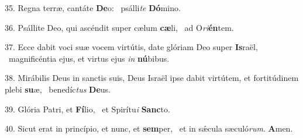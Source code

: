 35. Regna terræ, cantáte \textbf{De}o: \ast\  psálli\textit{te} \textbf{Dó}mino.\

36. Psállite Deo, qui ascéndit super cælum \textbf{cæ}li, \ast\  ad O\textit{ri}\textbf{én}tem.\

37. Ecce dabit voci suæ vocem virtútis, date glóriam Deo super \textbf{Is}raël, \ast\  magnificéntia ejus, et virtus ejus \textit{in} \textbf{nú}bibus.\

38. Mirábilis Deus in sanctis suis, Deus Israël ipse dabit virtútem, et fortitúdinem plebi \textbf{su}æ, \ast\  benedíc\textit{tus} \textbf{De}us.\

39. Glória Patri, et \textbf{Fí}lio, \ast\  et Spirítu\textit{i} \textbf{Sanc}to.\

40. Sicut erat in princípio, et nunc, et \textbf{sem}per, \ast\  et in sǽcula sæculó\textit{rum}. \textbf{A}men.\

